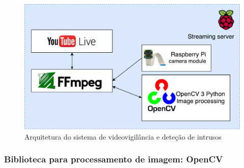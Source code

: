 



\begin{figure}[h]
	\centering
	\includegraphics[scale = 0.39]{esquemas/videostream.pdf}
	\caption{Arquitetura do sistema de videovigilância e deteção de intrusos }
	\label{arquiteturavisao}
\end{figure}



\subsubsection{Biblioteca para processamento de imagem: OpenCV}

